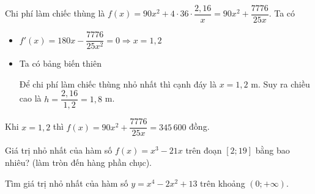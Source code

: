\begin{ex}
\begin{ex}
{\begin{itemchoice}
 Chi phí làm chiếc thùng là $ f(x)=90x^{2}+4\cdot 36\cdot \dfrac{2{,}16}{x}=90x^{2}+\dfrac{7776}{25x} $. Ta có
 \begin{itemize}
 \item [$\bullet$] $ f'(x)=180x-\dfrac{7776}{25x^{2}}=0\Rightarrow x=1{,}2 $
 \item [$\bullet$] Ta có bảng biến thiên
 \begin{center}
 \end{center}
 Để chi phí làm chiếc thùng nhỏ nhất thì cạnh đáy là $x= 1{,}2 $ m. Suy ra chiều cao là $ h=\dfrac{2{,}16}{1{,}2}=1{,}8 $ m.
 \end{itemize}
 \itemch Khi $x= 1{,}2 $ thì $f(x)=90x^{2}+\dfrac{7776}{25x}=345\,600$ đồng.
 \end{itemchoice}
 }
\end{ex}
\BTTL
\begin{ex}
 Giá trị nhỏ nhất của hàm số $f\left(x\right)=x^3-21x$ trên đoạn $\left[2;19\right]$ bằng bao nhiêu? (làm tròn đến hàng phần chục).\\
\end{ex}
\begin{ex}
 Tìm giá trị nhỏ nhất của hàm số $y=x^4-2x^2+13$ trên khoảng $(0;+\infty)$.\\
\end{ex}
\end{ex}
